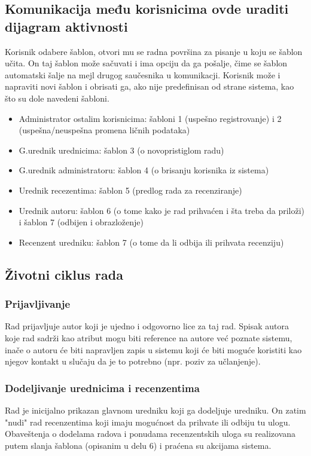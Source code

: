 \documentclass[a4paper]{article}
\begin{document}
\subsection{Komunikacija među korisnicima ovde uraditi dijagram aktivnosti}
Korisnik odabere šablon, otvori mu se radna površina za pisanje u koju se šablon učita. On taj šablon može sačuvati i ima opciju da ga pošalje, čime se šablon automatski šalje na mejl drugog saučesnika u komunikacji. Korisnik može i napraviti novi šablon i obrisati ga, ako nije predefinisan od strane sistema, kao što su dole navedeni šabloni.
\begin{itemize}
\item Administrator ostalim korisnicima: šabloni 1 (uspešno registrovanje) i 2 (uspešna/neuspešna promena ličnih podataka)
\item G.urednik urednicima: šablon 3 (o novopristiglom radu)
\item G.urednik administratoru: šablon 4 (o brisanju korisnika iz sistema)
\item Urednik recezentima: šablon 5 (predlog rada za recenziranje)
\item Urednik autoru: šablon 6 (o tome kako je rad prihvaćen i šta treba da priloži) i  šablon 7 (odbijen i obrazloženje) 
\item Recenzent uredniku: šablon 7 (o tome da li odbija ili prihvata recenziju)
\end{itemize}

\subsection{Životni ciklus rada}
\subsubsection{Prijavljivanje}
Rad prijavljuje autor koji je ujedno i odgovorno lice za taj rad. Spisak autora koje rad sadrži kao atribut mogu biti reference na autore već poznate sistemu, inače o autoru će biti napravljen zapis u sistemu koji će biti moguće koristiti kao njegov kontakt u slučaju da je to potrebno (npr. poziv za učlanjenje).
\subsubsection{Dodeljivanje urednicima i recenzentima}
Rad je inicijalno prikazan glavnom uredniku koji ga dodeljuje uredniku. On zatim "nudi" rad recenzentima koji imaju mogućnost da prihvate ili odbiju tu ulogu. Obaveštenja o dodelama radova i ponudama recenzentskih uloga su realizovana putem slanja šablona (opisanim u delu 6) i praćena su akcijama sistema.
\end{document}
